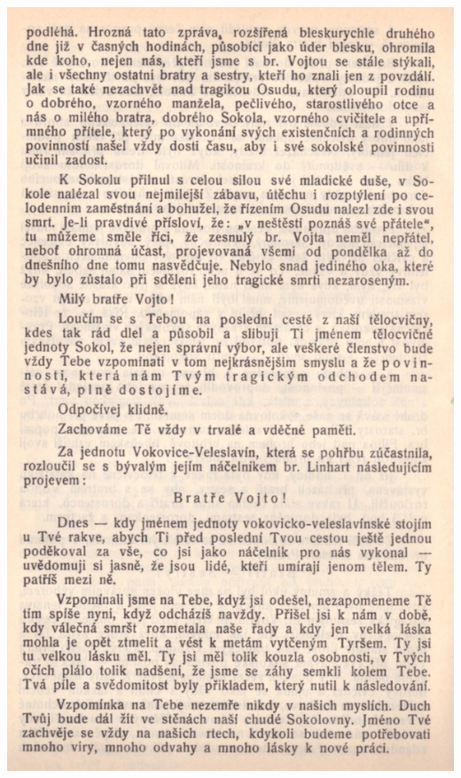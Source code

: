 \documentclass[11pt]{article}
\begin{document}
\includegraphics[width=\imagewidth]{original/1930/Skener_20250407 (3).jpg}
\end{document}
